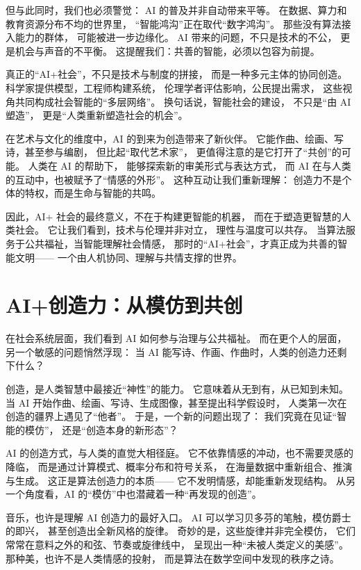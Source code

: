 但与此同时，我们也必须警觉：  
AI 的普及并非自动带来平等。  
在数据、算力和教育资源分布不均的世界里，  
“智能鸿沟”正在取代“数字鸿沟”。  
那些没有算法接入能力的群体，  
可能被进一步边缘化。  
AI 带来的问题，不只是技术的不公，  
更是机会与声音的不平衡。  
这提醒我们：共善的智能，必须以包容为前提。

真正的“AI+社会”，不只是技术与制度的拼接，  
而是一种多元主体的协同创造。  
科学家提供模型，工程师构建系统，  
伦理学者评估影响，公民提出需求，  
这些视角共同构成社会智能的“多层网络”。  
换句话说，智能社会的建设，  
不只是“由 AI 塑造”，  
更是“人类重新塑造社会的机会”。

在艺术与文化的维度中，AI 的到来为创造带来了新伙伴。  
它能作曲、绘画、写诗，甚至参与编剧，  
但比起“取代艺术家”，  
更值得注意的是它打开了“共创”的可能。  
人类在 AI 的帮助下，  
能够探索新的审美形式与表达方式，  
而 AI 在与人类的互动中，也被赋予了“情感的外形”。  
这种互动让我们重新理解：  
创造力不是个体的特权，而是生命与智能的共鸣。

因此，AI+ 社会的最终意义，不在于构建更智能的机器，  
而在于塑造更智慧的人类社会。  
它让我们看到，技术与伦理并非对立，  
理性与温度可以共存。  
当算法服务于公共福祉，当智能理解社会情感，  
那时的“AI+社会”，才真正成为共善的智能文明——  
一个由人机协同、理解与共情支撑的世界。

\section{AI+创造力：从模仿到共创}

在社会系统层面，我们看到 AI 如何参与治理与公共福祉。  
而在更个人的层面，另一个敏感的问题悄然浮现：  
当 AI 能写诗、作画、作曲时，人类的创造力还剩下什么？

创造，是人类智慧中最接近“神性”的能力。  
它意味着从无到有，从已知到未知。  
当 AI 开始作曲、绘画、写诗、生成图像，甚至提出科学假设时，  
人类第一次在创造的疆界上遇见了“他者”。  
于是，一个新的问题出现了：  
我们究竟在见证“智能的模仿”，  
还是“创造本身的新形态”？

AI 的创造方式，与人类的直觉大相径庭。  
它不依靠情感的冲动，也不需要灵感的降临，  
而是通过计算模式、概率分布和符号关系，  
在海量数据中重新组合、推演与生成。  
这正是算法创造力的本质——  
它不发明情感，却能重新发现结构。  
从另一个角度看，AI 的“模仿”中也潜藏着一种“再发现的创造”。

音乐，也许是理解 AI 创造力的最好入口。  
AI 可以学习贝多芬的笔触，模仿爵士的即兴，  
甚至创造出全新风格的旋律。  
奇妙的是，这些旋律并非完全模仿，  
它们常常在意料之外的和弦、节奏或旋律线中，  
呈现出一种“未被人类定义的美感”。  
那种美，也许不是人类情感的投射，  
而是算法在数学空间中发现的秩序之诗。

